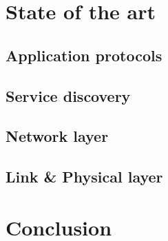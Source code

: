 \documentclass[8pt]{beamer}
\begin{document}
\section{State of the art}
		
	\subsection{Application protocols}
		
		
	\subsection{Service discovery}
		
	\subsection{Network layer}
		
		
	\subsection{Link \& Physical layer}
		
		
\section{Conclusion}
		
		
\end{document}
